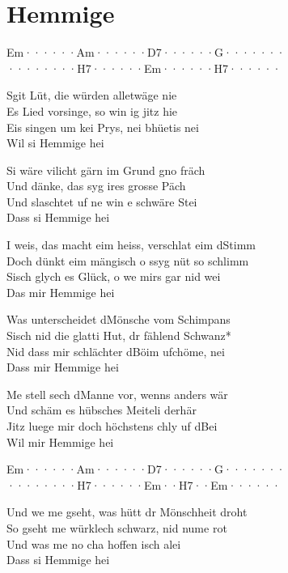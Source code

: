 \documentclass[
  letterpaper,
  twoside=false]{scrbook}
\begin{document}
\hypertarget{hemmige}{%
\chapter{Hemmige}\label{hemmige}}

\textbar Em······\textbar Am······\textbar D7······\textbar G·······\textbar{}\\
\textbar········\textbar H7······\textbar Em······\textbar H7······\textbar{}

S\textquotesingle git Lüt, die würden alletwäge nie\\
Es Lied vorsinge, so win ig jitz hie\\
Eis singen um kei Prys, nei bhüetis nei\\
Wil si Hemmige hei

Si wäre vilicht gärn im Grund gno fräch\\
Und dänke, das syg ires grosse Päch\\
Und s\textquotesingle laschtet uf ne win e schwäre Stei\\
Dass si Hemmige hei

I weis, das macht eim heiss, verschlat eim d\textquotesingle Stimm\\
Doch dünkt eim mängisch o s\textquotesingle syg nüt so schlimm\\
S\textquotesingle isch glych es Glück, o we mirs gar nid wei\\
Das mir Hemmige hei

Was unterscheidet d\textquotesingle Mönsche vom Schimpans\\
S\textquotesingle isch nid die glatti Hut, dr fählend Schwanz*\\
Nid dass mir schlächter d\textquotesingle Böim ufchöme, nei\\
Dass mir Hemmige hei

Me stell sech d\textquotesingle Manne vor, wenns anders wär\\
Und s\textquotesingle chäm es hübsches Meiteli derhär\\
Jitz luege mir doch höchstens chly uf d\textquotesingle Bei\\
Wil mir Hemmige hei

\textbar Em······\textbar Am······\textbar D7······\textbar G·······\textbar{}\\
\textbar········\textbar H7······\textbar Em··H7··\textbar Em······\textbar{}

Und we me gseht, was hütt dr Mönschheit droht\\
So gseht me würklech schwarz, nid nume rot\\
Und was me no cha hoffen isch alei\\
Dass si Hemmige hei
\end{document}
